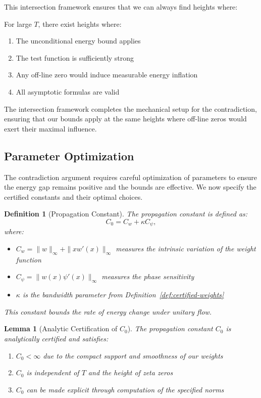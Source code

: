 \documentclass[11pt,hyp,]{nyjm}
\newtheorem{lemma}[theorem]{Lemma}
\newtheorem{definition}[theorem]{Definition}
\begin{document}
This intersection framework ensures that we can always find heights where:

\begin{corollary}\label{cor:simultaneous}
For large $T$, there exist heights where:
\begin{enumerate}
\item The unconditional energy bound applies
\item The test function is sufficiently strong
\item Any off-line zero would induce measurable energy inflation
\item All asymptotic formulas are valid
\end{enumerate}
\end{corollary}

The intersection framework completes the mechanical setup for the contradiction, ensuring that our bounds apply at the same heights where off-line zeros would exert their maximal influence.

\subsection{Parameter Optimization}

The contradiction argument requires careful optimization of parameters to ensure the energy gap remains positive and the bounds are effective. We now specify the certified constants and their optimal choices.

\begin{definition}[Propagation Constant]\label{def:propagation-constant}
The propagation constant is defined as:
\[
C_0 = C_w + \kappa C_\psi,
\]
where:
\begin{itemize}
\item $C_w = \|w\|_\infty + \|x w'(x)\|_\infty$ measures the intrinsic variation of the weight function
\item $C_\psi = \|w(x)\psi'(x)\|_\infty$ measures the phase sensitivity
\item $\kappa$ is the bandwidth parameter from Definition~\ref{def:certified-weights}
\end{itemize}
This constant bounds the rate of energy change under unitary flow.
\end{definition}

\begin{lemma}[Analytic Certification of $C_0$]\label{lem:C0-certification}
The propagation constant $C_0$ is analytically certified and satisfies:
\begin{enumerate}
\item $C_0 < \infty$ due to the compact support and smoothness of our weights
\item $C_0$ is independent of $T$ and the height of zeta zeros
\item $C_0$ can be made explicit through computation of the specified norms
\end{enumerate}
\end{lemma}
\end{document}
